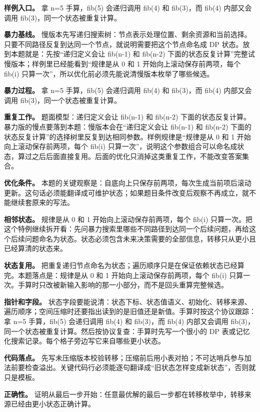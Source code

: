 \textbf{样例入口。} 拿 n=5 手算，fib(5) 会递归调用 fib(4) 和 fib(3)，而 fib(4) 内部又会调用 fib(3)，同一个状态被重复计算。

\textbf{暴力基线。} 慢版本先写递归搜索树：节点表示处理位置、剩余资源和当前选择。只要不同路径反复到达同一个节点，就说明需要把这个节点命名成 DP 状态。放到本题就是：先按“递归定义会让 fib(n-1) 和 fib(n-2) 下面的状态反复计算”完整试慢版本；样例里已经能看到“规律是从 0 和 1 开始向上滚动保存前两项，每个 fib(i) 只算一次”，所以优化前必须先能说清慢版本枚举了哪些候选。

\textbf{暴力过程。} 拿 n=5 手算，fib(5) 会递归调用 fib(4) 和 fib(3)，而 fib(4) 内部又会调用 fib(3)，同一个状态被重复计算。

\textbf{重复工作。} 题面模型：递归定义会让 fib(n-1) 和 fib(n-2) 下面的状态反复计算。暴力版的慢点要落到本题：慢版本会在“递归定义会让 fib(n-1) 和 fib(n-2) 下面的状态反复计算”的选择树里反复到达相同参数。样例规律是“规律是从 0 和 1 开始向上滚动保存前两项，每个 fib(i) 只算一次”，说明这个参数组合可以命名成状态，算过之后后面直接复用。后面的优化只消掉这类重复工作，不能改变答案集合。

\textbf{优化条件。} 本题的关键观察是：自底向上只保存前两项，每次生成当前项后滚动更新。这句话必须能翻译成可维护状态；如果题目条件改变后观察不再成立，就不能继续套原来的写法。

\textbf{相邻状态。} 规律是从 0 和 1 开始向上滚动保存前两项，每个 fib(i) 只算一次。把这个特例继续拆开看：先问暴力搜索里哪些不同路径到达同一个后续问题，再给这个后续问题命名为状态。状态必须包含未来决策需要的全部信息，转移只从更小且已经算清的状态来。

\textbf{状态复用。} 把重复递归节点命名为状态；遍历顺序只是在保证依赖状态已经算完。本题落点是：规律是从 0 和 1 开始向上滚动保存前两项，每个 fib(i) 只算一次。手算时只改被新输入影响的那一小部分，而不是回头重算完整候选。

\textbf{指针和字段。} 状态字段要能说清：状态下标、状态值语义、初始化、转移来源、遍历顺序；空间压缩时还要指出读到的是旧值还是新值。手算时按这个协议跟踪：拿 n=5 手算，fib(5) 会递归调用 fib(4) 和 fib(3)，而 fib(4) 内部又会调用 fib(3)，同一个状态被重复计算。然后按协议复查：手算时先写一个很小的 DP 表或记忆化搜索记录。每个格子旁边写它来自哪些更小状态。

\textbf{代码落点。} 先写未压缩版本校验转移；压缩前后用小表对拍；不可达哨兵参与加法前要检查溢出。关键代码行必须能逐句翻译成“旧状态怎样变成新状态”，否则就只是模板。

\textbf{正确性。} 证明从最后一步开始：任意最优解的最后一步都在转移枚举中，转移来源已经由更小状态正确计算。

